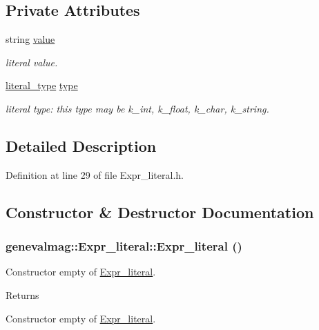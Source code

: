 \subsection*{Private Attributes}
\begin{DoxyCompactItemize}
\item 
string \hyperlink{classgenevalmag_1_1Expr__literal_a914b947ed414c6aae35eb7abcf8c7128}{value}
\begin{DoxyCompactList}\small\item\em literal value. \item\end{DoxyCompactList}\item 
\hyperlink{namespacegenevalmag_a054e5e9167597919bb2fe12ba999fb31}{literal\_\-type} \hyperlink{classgenevalmag_1_1Expr__literal_a9f3d9f0bda8307403f79d3260fa27740}{type}
\begin{DoxyCompactList}\small\item\em literal type: this type may be k\_\-int, k\_\-float, k\_\-char, k\_\-string. \item\end{DoxyCompactList}\end{DoxyCompactItemize}


\subsection{Detailed Description}


Definition at line 29 of file Expr\_\-literal.h.



\subsection{Constructor \& Destructor Documentation}
\hypertarget{classgenevalmag_1_1Expr__literal_aad56a6d5a1929c03b3c19ac10f06bf73}{
\subsubsection[{Expr\_\-literal}]{\setlength{\rightskip}{0pt plus 5cm}genevalmag::Expr\_\-literal::Expr\_\-literal ()}}
\label{classgenevalmag_1_1Expr__literal_aad56a6d5a1929c03b3c19ac10f06bf73}
Constructor empty of \hyperlink{classgenevalmag_1_1Expr__literal}{Expr\_\-literal}. \begin{DoxyReturn}{Returns}

\end{DoxyReturn}
Constructor empty of \hyperlink{classgenevalmag_1_1Expr__literal}{Expr\_\-literal}. 

